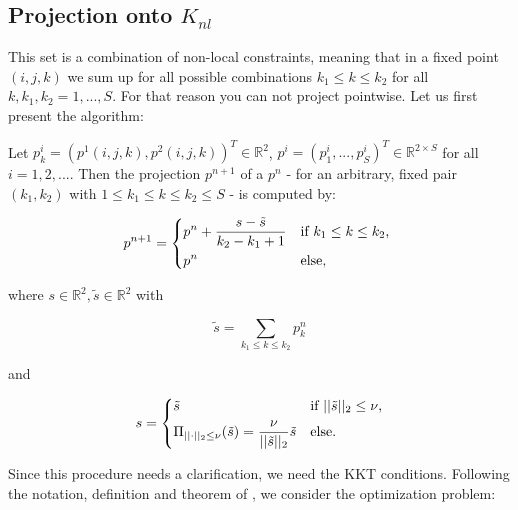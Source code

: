     \subsection{Projection onto $K_{nl}$}

        This set is a combination of non-local constraints, meaning that in a fixed point $(i, j, k)$ we sum up for all possible combinations $k_{1} \le k \le k_{2}$ for all $k, k_{1}, k_{2} = 1, ..., S$. For that reason you can not project pointwise. Let us first present the algorithm:

        \begin{algorithm}
        \label{alg:softshrinkage}
            Let $p^{i}_{k} = (p^{1}(i, j, k), p^{2}(i, j, k))^{T} \in \mathbb{R}^{2}$, $p^{i} = (p^{i}_{1}, ..., p^{i}_{S})^{T} \in \mathbb{R}^{2 \times S}$ for all $i = 1, 2, ...$. Then the projection $p^{n+1}$ of a $p^{n}$ - for an arbitrary, fixed pair $(k_{1}, k_{2})$ with $1 \le k_{1} \le k \le k_{2} \le S$ - is computed by:

                \[
                    p^{n+1} =
                        \begin{dcases*}
                            p^{n} + \frac{s - \tilde{s}}{k_{2} - k_{1} + 1} & \textnormal{if $k_{1} \le k \le k_{2}$}, \\
                            p^{n} & \textnormal{else},
                        \end{dcases*}
                \]

            where $s \in \mathbb{R}^{2}, \tilde{s} \in \mathbb{R}^{2}$ with

                $$\tilde{s} = \sum_{k_{1} \le k \le k_{2}} p^{n}_{k}$$

            and

                \[
                    s =
                        \begin{dcases*}
                            \tilde{s} & \textnormal{if $||\tilde{s}||_{2} \le \nu$},\\
                            \Pi_{||\cdot||_{2} \le \nu}(\tilde{s}) = \frac{\nu}{||\tilde{s}||_{2}} \tilde{s} & \textnormal{else}.
                        \end{dcases*}
                \]

        \end{algorithm}

        Since this procedure needs a clarification, we need the KKT conditions. Following the notation, definition and theorem of \cite{Nocedal-Wright}, we consider the optimization problem:

